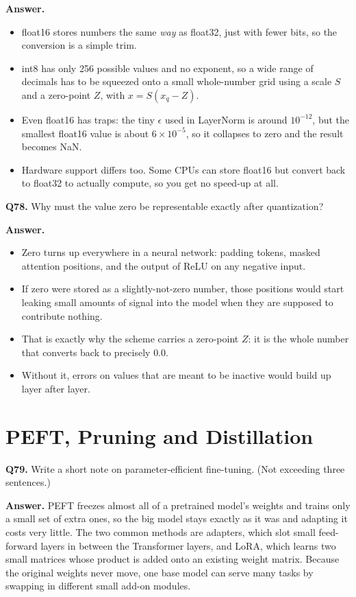 \documentclass[11pt]{article}
\begin{document}
\textbf{Answer.}
\begin{itemize}
  \item float16 stores numbers the same \emph{way} as float32, just with fewer bits, so the conversion is a simple trim.
  \item int8 has only 256 possible values and no exponent, so a wide range of decimals has to be squeezed onto a small whole-number grid using a scale $S$ and a zero-point $Z$, with $x = S(x_q - Z)$.
  \item Even float16 has traps: the tiny $\epsilon$ used in LayerNorm is around $10^{-12}$, but the smallest float16 value is about $6\times10^{-5}$, so it collapses to zero and the result becomes NaN.
  \item Hardware support differs too. Some CPUs can store float16 but convert back to float32 to actually compute, so you get no speed-up at all.
\end{itemize}

\medskip
\textbf{Q78.} Why must the value zero be representable exactly after quantization?

\textbf{Answer.}
\begin{itemize}
  \item Zero turns up everywhere in a neural network: padding tokens, masked attention positions, and the output of ReLU on any negative input.
  \item If zero were stored as a slightly-not-zero number, those positions would start leaking small amounts of signal into the model when they are supposed to contribute nothing.
  \item That is exactly why the scheme carries a zero-point $Z$: it is the whole number that converts back to precisely $0.0$.
  \item Without it, errors on values that are meant to be inactive would build up layer after layer.
\end{itemize}

\section{PEFT, Pruning and Distillation}

\textbf{Q79.} Write a short note on parameter-efficient fine-tuning. (Not exceeding three
sentences.)

\textbf{Answer.} PEFT freezes almost all of a pretrained model's weights and trains only a
small set of extra ones, so the big model stays exactly as it was and adapting it costs very
little. The two common methods are adapters, which slot small feed-forward layers in between
the Transformer layers, and LoRA, which learns two small matrices whose product is added onto
an existing weight matrix. Because the original weights never move, one base model can serve
many tasks by swapping in different small add-on modules.
\end{document}
